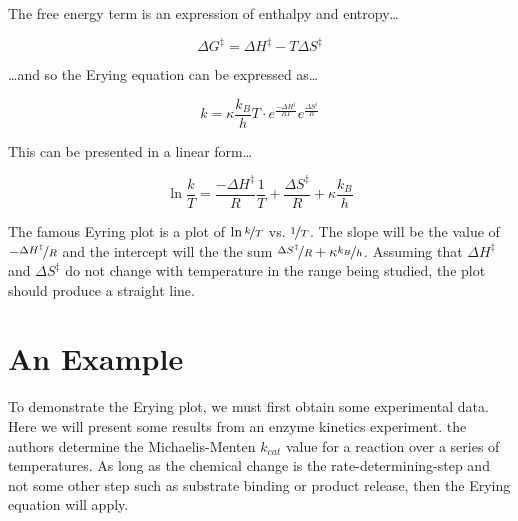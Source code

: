 \documentclass{tufte-handout}
\begin{document}
The free energy term is an expression of enthalpy and entropy\ldots

$$ \Delta G^\ddagger = \Delta H^\ddagger - T\Delta S^\ddagger $$

\noindent \ldots and so the Erying equation can be expressed as\ldots

$$ k = \kappa \frac{k_B}{h}T \cdot e^{\frac{-\Delta H^\ddagger}{RT}}e^{\frac{\Delta S^\ddagger}{R}}$$

This can be presented in a linear form\ldots

$$ \ln{\frac{k}{T}} = \frac{-\Delta H^\ddagger}{R} \frac{1}{T} + \frac{\Delta S^\ddagger}{R} + \kappa \frac{k_B}{h} $$ 
\vspace{0mm}

The famous Eyring plot is a plot of $\ln{\nicefrac{k}{T}}$ vs. $\nicefrac{1}{T}$. The slope will be the value of $-\nicefrac{\Delta H^\ddagger}{R}$ and the intercept will the the sum $\nicefrac{\Delta S^\ddagger}{R} + \kappa \nicefrac{k_B}{h}$. Assuming that $\Delta H^\ddagger$ and $\Delta S^\ddagger$ do not change with temperature in the range being studied, the plot should produce a straight line.




\section{An Example}

To demonstrate the Erying plot, we must first obtain some experimental data. Here we will present some results from an enzyme kinetics experiment. the authors determine the Michaelis-Menten $k_{cat}$ value for a reaction over a series of temperatures. As long as the chemical change is the rate-determining-step and not some other step such as substrate binding or product release,
then the Erying equation will apply.
\end{document}
